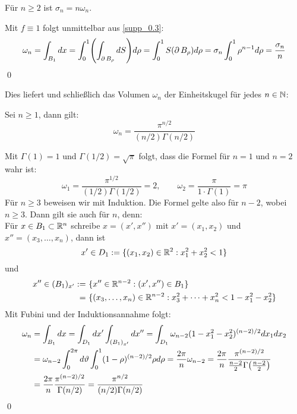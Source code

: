 \begin{thm} \label{supp_2.1}
	Für $n \geq 2$ ist $\sigma_n = n \omega_n$.
\end{thm}
	
	Mit $f \equiv 1$ folgt unmittelbar aus \eqref{supp_0.3}:
	\[	\omega_n = \int_{B_1} dx = \int_{0}^{1} \enbrace*{ \int_{\der B_\rho} dS} d\rho = \int_{0}^{1} S(\der B_\rho) d\rho = \sigma_n \int_0^1 \rho^{n-1} d\rho = \frac{\sigma_n}{n} \] \qed
	
Dies liefert und schließlich das Volumen $\omega_n$ der Einheitskugel für jedes $n \in \mathbb{N}$:

\begin{thm} \label{supp_2.2}
	Sei $n \geq 1$, dann gilt:
	\begin{equation} 
		\omega_n = \frac{\pi^{n/2}}{(n/2) \Gamma (n/2)} \label{supp_0.8} 
	\end{equation}
\end{thm}
	
	Mit $\Gamma(1) = 1$ und $\Gamma(1/2) = \sqrt{\pi}$ folgt, dass die Formel für $n=1$ und $n=2$ wahr ist:
	\[ \omega_1 = \frac{\pi^{1/2}}{(1/2)\Gamma(1/2)} = 2, \qquad \omega_2= \frac{\pi}{1 \cdot \Gamma(1)} = \pi \]
	Für $n \geq 3$ beweisen wir mit Induktion. Die Formel gelte also für $n - 2$, wobei $n \geq 3$. Dann gilt sie auch für $n$, denn: \\
	Für $x \in B_1 \subset \mathbb{R}^n$ schreibe $x = (x',x'')$ mit $x' = (x_1,x_2)$ und $x'' = (x_3,\dots,x_n)$, dann ist
	\[ x' \in D_1 := \{(x_1,x_2) \in \mathbb{R}^2 : x_1^2 + x_2^2 < 1 \} \]
	und
	\begin{equation}
	\begin{aligned}
		x'' \in (B_1)_{x'} := \ &\{x'' \in \mathbb{R}^{n-2} : (x',x'') \in B_1 \} \\ \notag
			= \ &\{(x_3,\dots,x_n) \in \mathbb{R}^{n-2} : x_3^2 + \dots + x_n^2 < 1 - x_1^2 - x_2^2 \}
	\end{aligned}
	\end{equation}
	Mit Fubini und der Induktionsannahme folgt:
	\begin{equation}
	\begin{aligned}
		\omega_n &= \int_{B_1} dx = \int_{D_1} dx' \int_{(B_1)_{x'}} dx'' 
			= \int_{D_1} \omega_{n-2} (1-x_1^2-x_2^2)^{(n-2)/2} dx_1 dx_2 \\
			&= \omega_{n-2} \int_0^{2\pi} d \vartheta \int_0^1 (1-\rho)^{(n-2)/2} \rho d\rho 
			= \frac{2\pi}{n} \omega_{n-2} = \frac{2\pi}{n} \frac{\pi^{(n-2)/2}}{\frac{n-2}{2} \Gamma \enbrace*{ \frac{n-2}{2}}} \\
			&= \frac{2\pi}{n} \frac{\pi^{(n-2)/2}}{\Gamma(n/2)} = \frac{\pi^{n/2}}{(n/2) \Gamma (n/2)} \notag
	\end{aligned}
	\end{equation}
	\qed
\newpage